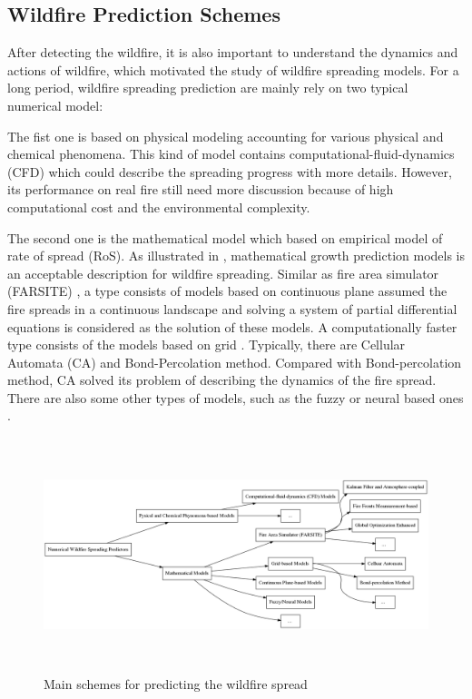 \subsection{Wildfire Prediction Schemes}
After detecting the wildfire, it is also important to understand the dynamics and actions of wildfire, which motivated the study of wildfire spreading models. For a long period, wildfire spreading prediction are mainly rely on two typical numerical model:\par
The fist one is based on physical modeling accounting for various physical and chemical phenomena. This kind of model contains computational-fluid-dynamics (CFD) \cite{mueller2014large} which could describe the spreading progress with more details. However, its performance on real fire still need more discussion because of high computational cost and the environmental complexity.\par
The second one is the mathematical model which based on empirical model of rate of spread (RoS). As illustrated in \cite{alexandridis2008cellular}, mathematical growth prediction models is an acceptable description for wildfire spreading. Similar as fire area simulator (FARSITE) \cite{finney1999farsite}, a type consists of models based on continuous plane assumed the fire spreads in a continuous landscape and solving a system of partial differential equations is considered as the solution of these models\cite{richards1995general}. A computationally faster type consists of the models based on grid \cite{pastor2003mathematical}. Typically, there are Cellular Automata (CA) \cite{trunfio2004predicting} and Bond-Percolation method. Compared with Bond-percolation method, CA solved its problem of describing the dynamics of the fire spread. There are also some other types of models, such as the fuzzy or neural based ones \cite{vakalis2004gis1,vakalis2004gis2}.\par
\begin{figure}[ht]
    \centering
    \includegraphics[height=68mm]{figs/figurepredictionmodel.png}
    \caption{Main schemes for predicting the wildfire spread}
    \label{fig:spreadmodel}
\end{figure}
